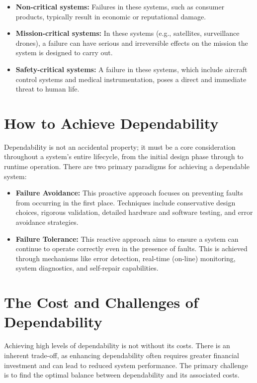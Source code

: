 \begin{itemize}
    \item \textbf{Non-critical systems:} Failures in these systems, such as consumer products, typically result in economic or reputational damage.
    \item \textbf{Mission-critical systems:} In these systems (e.g., satellites, surveillance drones), a failure can have serious and irreversible effects on the mission the system is designed to carry out.
    \item \textbf{Safety-critical systems:} A failure in these systems, which include aircraft control systems and medical instrumentation, poses a direct and immediate threat to human life.
\end{itemize}

\section{How to Achieve Dependability}

Dependability is not an accidental property; it must be a core consideration throughout a system's entire lifecycle, from the initial design phase through to runtime operation. There are two primary paradigms for achieving a dependable system:

\begin{itemize}
    \item \textbf{Failure Avoidance:} This proactive approach focuses on preventing faults from occurring in the first place. Techniques include conservative design choices, rigorous validation, detailed hardware and software testing, and error avoidance strategies.
    \item \textbf{Failure Tolerance:} This reactive approach aims to ensure a system can continue to operate correctly even in the presence of faults. This is achieved through mechanisms like error detection, real-time (on-line) monitoring, system diagnostics, and self-repair capabilities.
\end{itemize}

\section{The Cost and Challenges of Dependability}

Achieving high levels of dependability is not without its costs. There is an inherent trade-off, as enhancing dependability often requires greater financial investment and can lead to reduced system performance. The primary challenge is to find the optimal balance between dependability and its associated costs.


